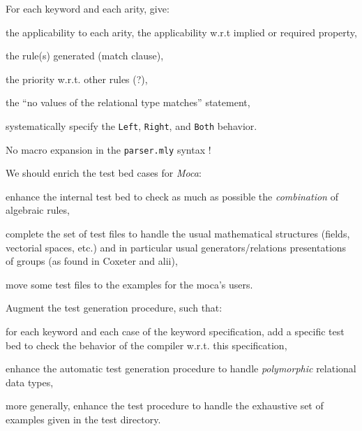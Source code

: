 

For each keyword and each arity, give:

\begin{citemize}
  \item the applicability to each arity, the applicability w.r.t implied or required property,
  \item the rule(s) generated (match clause),
  \item the priority w.r.t. other rules (?),
  \item the ``no values of the relational type matches'' statement,
  \item systematically specify the {\tt Left}, {\tt Right}, and {\tt Both} behavior.
\end{citemize}

No macro expansion in the {\tt parser.mly} syntax !



We should enrich the test bed cases for {\em Moca}:

\begin{citemize}
  \item enhance the internal test bed to check as much as possible
  the {\em combination} of algebraic rules,
  \item complete the set of test files to handle the usual mathematical
  structures (fields, vectorial spaces, etc.) and in particular usual
  generators/relations presentations of groups (as found in Coxeter and alii),
  \item move some test files to the examples for the moca's users.
\end{citemize}



Augment the test generation procedure, such that:

\begin{citemize}
  \item for each keyword and each case of the keyword specification, add a
  specific test bed to check the behavior of the compiler w.r.t. this specification,
  \item enhance the automatic test generation procedure to handle {\em polymorphic}
  relational data types,
  \item more generally, enhance the test procedure to handle the exhaustive
  set of examples given in the test directory.
\end{citemize}

